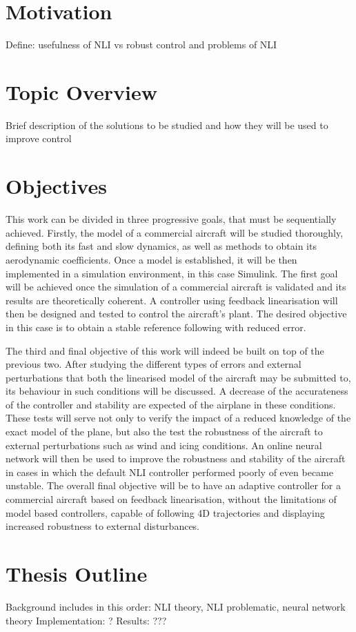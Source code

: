 \section{Motivation}
\label{section:motivation}

Define: usefulness of NLI vs robust control and problems of NLI


\section{Topic Overview}
\label{section:overview}

Brief description of the solutions to be studied and how they will be used to improve control


\section{Objectives}
\label{section:objectives}

This work can be divided in three progressive goals, that must be sequentially achieved. Firstly, the model of a commercial aircraft will be studied thoroughly, defining both its fast and slow dynamics, as well as methods to obtain its aerodynamic coefficients. Once a model is established, it will be then implemented in a simulation environment, in this case Simulink. The first goal will be achieved once the simulation of a commercial aircraft is validated and its results are theoretically coherent. A controller using feedback linearisation will then be designed and tested to control the aircraft's plant. The desired objective in this case is to obtain a stable reference following with reduced error.

The third and final objective of this work will indeed be built on top of the previous two. After studying the different types of errors and external perturbations that both the linearised model of the aircraft may be submitted to, its behaviour in such conditions will be discussed. A decrease of the accurateness of the controller and stability are expected of the airplane in these conditions.
These tests will serve not only to verify the impact of a reduced knowledge of the exact model of the plane, but also the test the robustness of the aircraft to external perturbations such as wind and icing conditions. An online neural network will then be used to improve the robustness and stability of the aircraft in cases in which the default NLI controller performed poorly of even became unstable. The overall final objective will be to have an adaptive controller for a commercial aircraft based on feedback linearisation, without the limitations of model based controllers, capable of following 4D trajectories and displaying increased robustness to external disturbances. 

\section{Thesis Outline}
\label{section:outline}

Background includes in this order: NLI theory, NLI problematic, neural network theory
Implementation: ?
Results: ???

